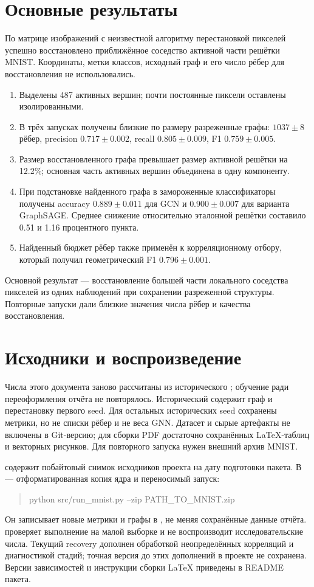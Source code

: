 \documentclass[11pt,a4paper]{article}
\begin{document}
\clearpage
\section{Основные результаты}
По матрице изображений с неизвестной алгоритму перестановкой пикселей успешно
восстановлено приближённое соседство активной части решётки MNIST.
Координаты, метки классов, исходный граф и его число рёбер для восстановления не использовались.
\begin{enumerate}
\item Выделены 487 активных вершин; почти постоянные пиксели оставлены изолированными.
\item В трёх запусках получены близкие по размеру разреженные графы:
$1037\pm8$ рёбер, precision $0.717\pm0.002$, recall $0.805\pm0.009$,
F1 $0.759\pm0.005$.
\item Размер восстановленного графа превышает размер активной решётки на 12.2\%;
основная часть активных вершин объединена в одну компоненту.
\item При подстановке найденного графа в замороженные классификаторы получены
accuracy $0.889\pm0.011$ для GCN и $0.900\pm0.007$ для варианта GraphSAGE.
Среднее снижение относительно эталонной решётки составило 0.51 и 1.16 процентного пункта.
\item Найденный бюджет рёбер также применён к корреляционному отбору,
который получил геометрический F1 $0.796\pm0.001$.
\end{enumerate}
Основной результат --- восстановление большей части локального соседства пикселей
из одних наблюдений при сохранении разреженной структуры. Повторные запуски дали
близкие значения числа рёбер и качества восстановления.

\section{Исходники и воспроизведение}
Числа этого документа заново рассчитаны из исторического ;
обучение ради переоформления отчёта не повторялось.
Исторический  содержит граф и перестановку первого seed.
Для остальных исторических seed сохранены метрики, но не списки рёбер и не веса GNN.
Датасет и сырые артефакты не включены в Git-версию; для сборки PDF достаточно
сохранённых LaTeX-таблиц и векторных рисунков. Для повторного запуска нужен внешний архив MNIST.
\par {} содержит побайтовый снимок исходников проекта на дату
подготовки пакета. В  --- отформатированная копия ядра и переносимый запуск:
\begin{quote}\ttfamily python src/run\_mnist.py --zip PATH\_TO\_MNIST.zip\end{quote}
Он записывает новые метрики и графы в , не меняя сохранённые данные отчёта.
 проверяет выполнение на малой выборке и не воспроизводит исследовательские числа.
Текущий recovery дополнен обработкой неопределённых корреляций и диагностикой стадий;
точная версия до этих дополнений в проекте не сохранена.
Версии зависимостей и инструкции сборки LaTeX приведены в README пакета.
\end{document}
